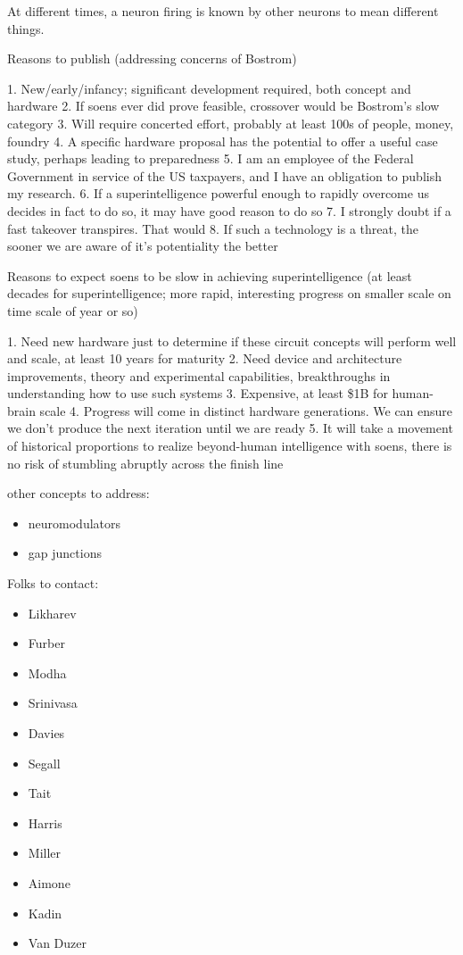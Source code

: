 \documentclass[twocolumn]{article}
\begin{document}
\vspace{2em}
At different times, a neuron firing is known by other neurons to mean different things.

\vspace{3em}
Reasons to publish (addressing concerns of Bostrom)

1. New/early/infancy; significant development required, both concept and hardware
2. If soens ever did prove feasible, crossover would be Bostrom's slow category
3. Will require concerted effort, probably at least 100s of people, money, foundry
4. A specific hardware proposal has the potential to offer a useful case study, perhaps leading to preparedness
5. I am an employee of the Federal Government in service of the US taxpayers, and I have an obligation to publish my research.
6. If a superintelligence powerful enough to rapidly overcome us decides in fact to do so, it may have good reason to do so
7. I strongly doubt if a fast takeover transpires. That would
8. If such a technology is a threat, the sooner we are aware of it's potentiality the better

Reasons to expect soens to be slow in achieving superintelligence (at least decades for superintelligence; more rapid, interesting progress on smaller scale on time scale of year or so)

1. Need new hardware just to determine if these circuit concepts will perform well and scale, at least 10 years for maturity
2. Need device and architecture improvements, theory and experimental capabilities, breakthroughs in understanding how to use such systems
3. Expensive, at least \$1B for human-brain scale
4. Progress will come in distinct hardware generations. We can ensure we don't produce the next iteration until we are ready
5. It will take a movement of historical proportions to realize beyond-human intelligence with soens, there is no risk of stumbling abruptly across the finish line

\vspace{3em}
other concepts to address:
\begin{itemize}
\item neuromodulators
\item gap junctions
\end{itemize}

\vspace{3em}
Folks to contact:
\begin{itemize} 
\item Likharev
\item Furber
\item Modha
\item Srinivasa
\item Davies
\item Segall
\item Tait
\item Harris
\item Miller
\item Aimone
\item Kadin
\item Van Duzer
\end{itemize}
	
\end{document}
